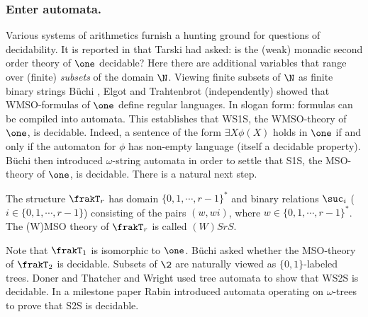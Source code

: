 


\subsubsection*{Enter automata.}
%

Various systems of arithmetics furnish a hunting ground for questions of decidability. 
It is reported in \cite{Robi58} that Tarski had asked: is the (weak) monadic second order theory of $\one$ decidable? Here there are additional variables that
range over (finite) {\em subsets} of the domain $\N$. Viewing finite subsets of $\N$ as finite binary strings B\"uchi \cite{Buch60}, Elgot \cite{Elgo61} and Trahtenbrot \cite{trah62} (independently) showed that WMSO-formulas of $\one$ define regular languages. In slogan form: formulas can be compiled into automata. This establishes that WS1S, the WMSO-theory of $\one$, is decidable. Indeed, a sentence of the form $\exists X \phi(X)$ holds in $\one$ if and only if the automaton for $\phi$ has non-empty language (itself a decidable property). B\"uchi \cite{Buch62} then introduced $\omega$-string automata in order to settle that S1S, the MSO-theory of $\one$, is decidable.
There is a natural next step.

\begin{definition}
The structure  $\frakT_r$ has domain $\{0,1, \cdots,r-1\}^\ast$ and binary relations $\suc_i$ ($i \in \{0,1, \cdots, r-1\}$) 
consisting of the pairs $(w,wi)$, where $w \in \{0,1,\cdots,r-1\}^\ast$. The (W)MSO theory of $\frakT_r$ is called $(W)SrS$. 
\end{definition}
Note that $\frakT_1$ is isomorphic to $\one$. B\"uchi \cite{Buch62} asked  whether the 
MSO-theory of $\frakT_2$ is decidable. Subsets of $\2$ are naturally viewed as $\{0,1\}$-labeled trees.
Doner \cite{Done70} and Thatcher and Wright \cite{ThWr68} used tree automata to show that WS2S is decidable. In a milestone paper Rabin \cite{Rabi69} introduced automata operating on 
$\omega$-trees to prove that S2S is decidable.

